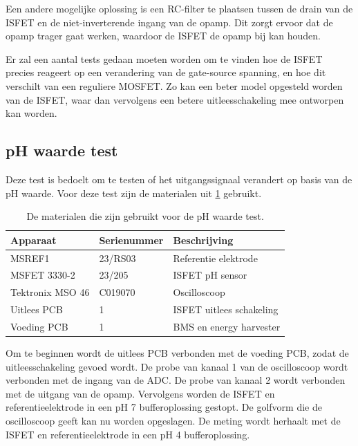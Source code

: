 Een andere mogelijke oplossing is een RC-filter te plaatsen tussen de drain van de ISFET en de niet-inverterende ingang van de opamp. Dit zorgt ervoor dat de opamp trager gaat werken, waardoor de ISFET de opamp bij kan houden.

Er zal een aantal tests gedaan moeten worden om te vinden hoe de ISFET precies reageert op een verandering van de gate-source spanning, en hoe dit verschilt van een reguliere MOSFET. Zo kan een beter model opgesteld worden van de ISFET, waar dan vervolgens een betere uitleesschakeling mee ontworpen kan worden.


\subsection{pH waarde test} \label{sec:phTest}
Deze test is bedoelt om te testen of het uitgangssignaal verandert op basis van de pH waarde. Voor deze test zijn de materialen uit \cref{tab:testMaterialen2} gebruikt.
\begin{table}[!htbp]
    \centering
    \begin{tabular}{l|l|l}
        Apparaat         & Serienummer & Beschrijving \\
        \hline
        MSREF1           & 23/RS03     & Referentie elektrode       \\
        MSFET 3330-2     & 23/205      & ISFET pH sensor            \\
        Tektronix MSO 46 & C019070     & Oscilloscoop               \\
        Uitlees PCB      & 1           & ISFET uitlees schakeling   \\
        Voeding PCB      & 1           & BMS en energy harvester    \\
        \hline
    \end{tabular}
    \caption{De materialen die zijn gebruikt voor de pH waarde test.}
    \label{tab:testMaterialen2}
\end{table}

Om te beginnen wordt de uitlees PCB verbonden met de voeding PCB, zodat de uitleesschakeling gevoed wordt. De probe van kanaal 1 van de oscilloscoop wordt verbonden met de ingang van de ADC. De probe van kanaal 2 wordt verbonden met de uitgang van de opamp. Vervolgens worden de ISFET en referentieelektrode in een pH 7 bufferoplossing gestopt. De golfvorm die de oscilloscoop geeft kan nu worden opgeslagen. De meting wordt herhaalt met de ISFET en referentieelektrode in een pH 4 bufferoplossing.

